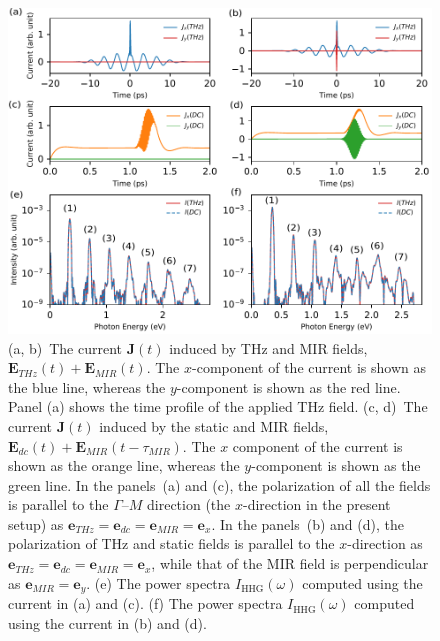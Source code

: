\begin{figure}[ht]
	\includegraphics[width=0.9\linewidth]{pic/fig1.pdf}
	\caption{\label{fig:current}
		(a, b)~The current $\mathbf{J} (t)$ induced by THz and MIR fields, $\mathbf E_{THz}(t)+\mathbf E_{MIR}(t)$. The $x$-component of the current is shown as the blue line, whereas the $y$-component is shown as the red line. Panel (a) shows the time profile of the applied THz field. (c, d)~The current $\mathbf{J}(t)$ induced by the static and MIR fields, $\mathbf E_{dc}(t)+\mathbf E_{MIR}(t-\tau_{MIR})$. The $x$ component of the current is shown as the orange line, whereas the $y$-component is shown as the green line. In the panels~(a) and (c), the polarization of all the fields is parallel to the $\Gamma$--$M$ direction (the $x$-direction in the present setup) as $\mathbf e_{THz}=\mathbf e_{dc}=\mathbf e_{MIR}=\mathbf e_x$. In the panels~(b) and (d), the polarization of THz and static fields is parallel to the $x$-direction as $\mathbf e_{THz}=\mathbf e_{dc}=\mathbf e_{MIR}=\mathbf e_x$, while that of the MIR field is perpendicular as $\mathbf e_{MIR}=\mathbf e_y$. (e) The power spectra $I_{\mathrm{HHG}}(\omega)$ computed using the current in (a) and (c). (f) The power spectra $I_{\mathrm{HHG}}(\omega)$ computed using the current in (b) and (d).
	}
\end{figure}

